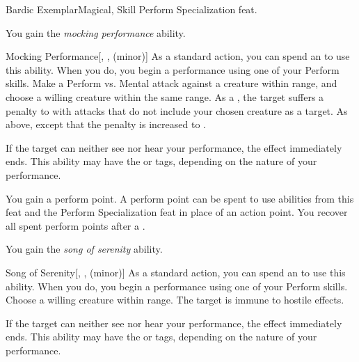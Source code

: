     \begin{feat}{Bardic Exemplar}{Magical, Skill}
        \featpre Perform Specialization feat.

         You gain the \textit{mocking performance} ability.
        \begin{ability}{Mocking Performance}[, ,  (minor)]
            As a standard action, you can spend an  to use this ability.
            When you do, you begin a performance using one of your Perform skills.
            Make a Perform vs. Mental attack against a creature within \rngmed range, and choose a willing creature within the same range.
            \hit As a , the target suffers a  penalty to  with attacks that do not include your chosen creature as a target.
            \crit As above, except that the penalty is increased to .

            If the target can neither see nor hear your performance, the effect immediately ends.
            This ability may have the  or  tags, depending on the nature of your performance.
        \end{ability}

         You gain a perform point.
        A perform point can be spent to use  abilities from this feat and the Perform Specialization feat in place of an action point.
        You recover all spent perform points after a .

         You gain the \textit{song of serenity} ability.
        \begin{ability}{Song of Serenity}[, ,  (minor)]
            As a standard action, you can spend an  to use this ability.
            When you do, you begin a performance using one of your Perform skills.
            Choose a willing creature within \rngmed range.
            The target is immune to hostile  effects.

            If the target can neither see nor hear your performance, the effect immediately ends.
            This ability may have the  or  tags, depending on the nature of your performance.
        \end{ability}


\end{feat}
